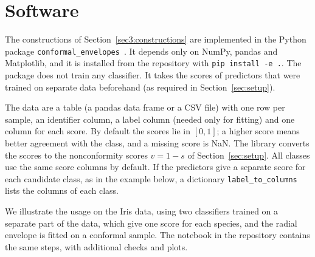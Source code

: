 \section{Software}\label{sec:software}

The constructions of Section~\ref{sec3:constructions} are implemented in the Python package 
\texttt{conformal\_envelopes}~\citep{conformalenvelopes}. It depends only on NumPy, pandas and Matplotlib, and it is 
installed from the repository with \texttt{pip install -e .}. The package does not train any classifier. It takes the 
scores of predictors that were trained on separate data beforehand (as required in Section~\ref{sec:setup}).

The data are a table (a pandas data frame or a CSV file) with one row per sample, an identifier column, 
a label column (needed only for fitting) and one column for each score. By default the scores lie in $[0,1]$; a higher 
score means better agreement with the class, and a missing score is NaN. The library converts the scores to the 
nonconformity scores $v=1-s$ of Section~\ref{sec:setup}. All classes use the same score columns by default. If the 
predictors give a separate score for each candidate class, as in the example below, a dictionary \texttt{label\_to\_columns} 
lists the columns of each class.


We illustrate the usage on the Iris data, using two classifiers trained on a separate part of the data, which give one 
score for each species, and the radial envelope is fitted on a conformal sample. The notebook in the repository contains 
the same steps, with additional checks and plots.



